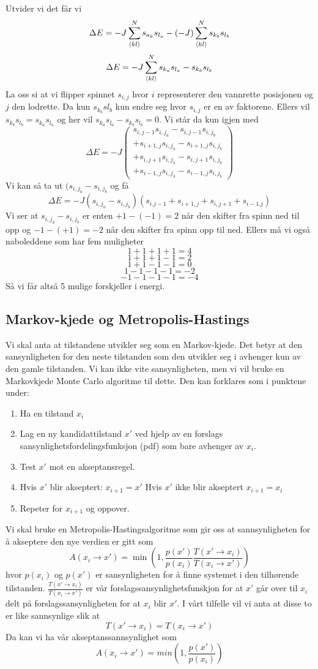 \documentclass[reprint,english,notitlepage]{revtex4-2}  %
\begin{document}
Utvider vi det får vi
$$
\Delta E=-J\sum_{\expval{kl}}^{N} s_{a_k} s_{l_a}-(-J)\sum_{\expval{kl}}^{N} s_{k_b} s_{l_b}
$$
$$
\Delta E=-J\sum_{\expval{kl}}^{N} s_{k_a}s_{l_a}-s_{k_b}s_{l_b}
$$
La oss si at vi flipper spinnet $s_{i,j}$ hvor $i$ representerer den vannrette posisjonen og $j$ den lodrette. Da kun $s_{k_b}s{l_b}$ kun endre seg hvor $s_{i,j}$ er en av faktorene. Ellers vil $s_{k_b}s_{l_b}=s_{k_a}s_{l_a}$ og her vil $s_{k_a}s_{l_a}-s_{k_b}s_{l_b}=0$. Vi står da kun igjen med
$$
\Delta E= -J \begin{pmatrix} s_{i,j-1}s_{i,j_a}-s_{i,j-1}s_{i,j_b}\\+s_{i+1,j}s_{i,j_a}-s_{i+1,j}s_{i,j_b} \\+ s_{i,j+1}s_{i,j_a}-s_{i,j+1}s_{i,j_b}\\+s_{i-1,j}s_{i,j_a}-s_{i-1,j}s_{i,j_b}\end{pmatrix}
$$
Vi kan så ta ut $(s_{i,j_a}-s_{i,j_b}$ og få
$$
\Delta E=-J(s_{i,j_a}-s_{i,j_b})(
s_{i.j-1}+s_{i+1,j} +s_{i,j+1}+s_{i-1.j}
)
$$
Vi ser at $s_{i,j_a}-s_{i,j_b}$ er enten $+1-(-1)=2$ når den skifter fra spinn ned til opp og $-1-(+1)=-2$ når den skifter fra spinn opp til ned. Ellers må vi også naboleddene som har fem muligheter
$$
1+1+1+1=4
$$
$$
1+1+1-1=2
$$
$$
1+1-1-1=0
$$
$$
1-1-1-1=-2
$$
$$
-1-1-1-1=-4
$$
Så vi får altså 5 mulige forskjeller i energi.
\subsection{Markov-kjede og  Metropolis-Hastings}
Vi skal anta at tilstandene utvikler seg som en Markov-kjede. Det betyr at den sansynligheten for den neste tilstanden som den utvikler seg i avhenger kun av den gamle tilstanden. Vi kan ikke vite sansynligheten, men vi vil bruke en Markovkjede Monte Carlo algoritme til dette. Den kan forklares som i punktene under:
\begin{enumerate}
	\item Ha en tilstand $x_i$
	\item Lag en ny kandidattilstand $x'$ ved hjelp av en forslags sansynlighetsfordelingsfunksjon (pdf) som bare avhenger av $x_i$.
	\item Test $x'$ mot en akseptansregel.
	\item Hvis $x'$ blir akseptert: $x_{i+1}=x'$
	\newline Hvis $x'$ ikke blir akseptert $x_{i+1}=x_i$
	\item Repeter for $x_{i+1}$ og oppover.
	
\end{enumerate}
Vi skal bruke en Metropolis-Hastingsalgoritme som gir oss at sannsynligheten for å akseptere den nye verdien er gitt som
$$
A(x_i\rightarrow x')=\min(1, \frac{p(x')}{p(x_i)}\frac{T(x'\rightarrow x_i)}{T(x_i\rightarrow x')})
$$
hvor $p(x_i)$ og $p(x')$ er sansynligheten for å finne systemet i den tilhørende tilstanden. $\frac{T(x'\rightarrow x_i)}{T(x_i\rightarrow x')}$ er vår forslagssansynlighetsfunskjon for at $x'$ går over til $x_i$ delt på forslagssansynligheten for at $x_i$ blir $x'$. I vårt tilfelle vil vi anta at disse to er like sannsynlige slik at $$T(x'\rightarrow x_i)=T(x_i\rightarrow x')$$ Da kan vi ha vår akseptanssannsynlighet som
$$
A(x_i\rightarrow x')=min(1, \frac{p(x')}{p(x_i)})
$$
\end{document}
